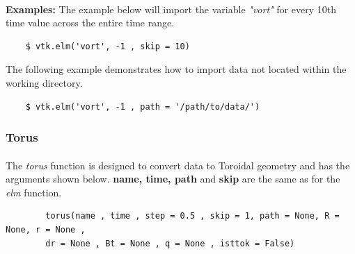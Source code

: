 \documentclass[12pt,a4paper]{article}
\begin{document}
	\paragraph{}
	\textbf{Examples:} The example below will import the variable \textit{"vort"} for every 10th time value across the entire time range.
	
	\begin{verbatim}
	$ vtk.elm('vort', -1 , skip = 10)
	\end{verbatim}
		
	The following example demonstrates how to import data not located within the working directory.
	
	\begin{verbatim}
	$ vtk.elm('vort', -1 , path = '/path/to/data/')
	\end{verbatim}
	\paragraph{}
	

	\subsubsection{Torus}
	\label{sec:torus_scalar}
	\paragraph{}
	The \textit{torus} function is designed to convert data to Toroidal geometry and has the arguments shown below.  \textbf{name, time, path} and \textbf{skip} are the same as for the \textit{elm} function.
	
	\begin{verbatim}
		torus(name , time , step = 0.5 , skip = 1, path = None, R = None, r = None ,
		dr = None , Bt = None , q = None , isttok = False)
	\end{verbatim}
	
\end{document}
